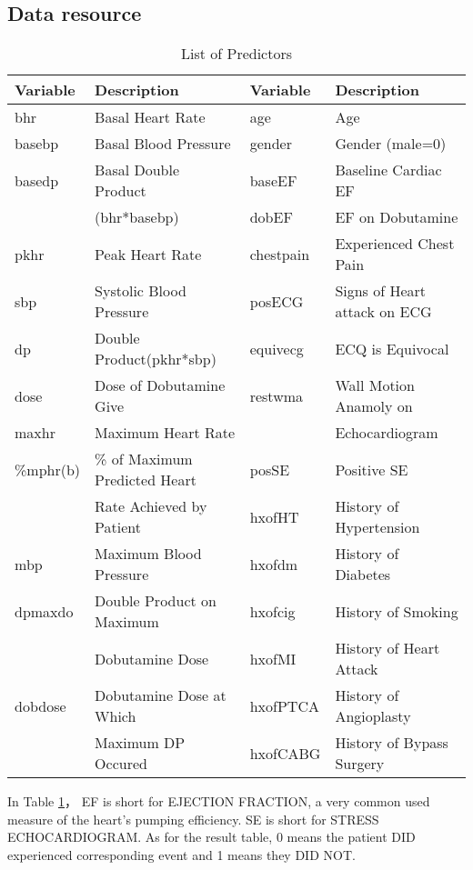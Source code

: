 \documentclass[a4paper,12pt]{article}
\begin{document}
  \subsection{Data resource}
    \begin{table}[htbp]
      \centering
      \caption{List of Predictors}
        \begin{tabular}{ll|ll}
        \toprule[1.5pt]        Variable & Description      & Variable     &Description  \\
        \midrule
        bhr   & Basal  Heart Rate & age   & Age \\
        basebp & Basal Blood Pressure & gender & Gender (male=0) \\
        basedp & Basal Double Product & baseEF & Baseline Cardiac EF \\
              &  (bhr*basebp) & dobEF & EF on Dobutamine \\
        pkhr  & Peak Heart Rate & chestpain  & Experienced Chest Pain \\
        sbp   & Systolic Blood Pressure & posECG & Signs of Heart attack on ECG \\
        dp    & Double Product(pkhr*sbp) & equivecg & ECQ is Equivocal \\
        dose  & Dose of Dobutamine Give & restwma & Wall Motion Anamoly on \\
        maxhr & Maximum Heart Rate &       &  Echocardiogram \\
        \%mphr(b) & \% of Maximum Predicted Heart & posSE  & Positive SE  \\
              & Rate Achieved by Patient & hxofHT & History of Hypertension \\
        mbp   & Maximum Blood Pressure & hxofdm & History of Diabetes \\
        dpmaxdo & Double Product on Maximum & hxofcig & History of Smoking \\
              &  Dobutamine Dose & hxofMI & History of Heart Attack \\
        dobdose & Dobutamine Dose at Which  & hxofPTCA & History of Angioplasty \\
              & Maximum DP Occured & hxofCABG & History of Bypass Surgery \\
        \bottomrule[1.5pt]
        \end{tabular}%
      \label{LoV}%
    \end{table}%
   In Table \ref{LoV}， EF is short for EJECTION FRACTION, a very common used measure of the heart's pumping efficiency. SE is short for STRESS ECHOCARDIOGRAM. As for the result table, 0 means the patient DID experienced corresponding event and 1 means they DID NOT.
\end{document}
